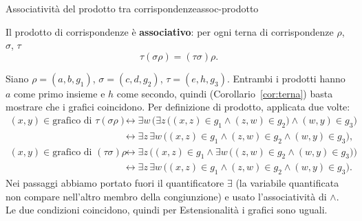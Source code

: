 \begin{concetto}
\begin{Proposizione}{Associatività del prodotto tra corrispondenze}{assoc-prodotto}
    \begin{prerequisiti}
    \end{prerequisiti}
    Il prodotto di corrispondenze è \textbf{associativo}: per ogni terna di corrispondenze $\rho$, $\sigma$, $\tau$
    \[ \tau(\sigma\rho) = (\tau\sigma)\rho. \]
\end{Proposizione}
\begin{dimostrazione}
    Siano $\rho = (a, b, g_1)$, $\sigma = (c, d, g_2)$, $\tau = (e, h, g_3)$. Entrambi i prodotti hanno $a$ come primo
    insieme e $h$ come secondo, quindi (Corollario~\ref{cor:terna}) basta mostrare che i grafici coincidono.
    Per definizione di prodotto, applicata due volte:
    \[
    \begin{aligned}
        (x, y) \in \text{grafico di } \tau(\sigma\rho) &\leftrightarrow \exists w\,\Big(\exists z\,\big((x, z) \in g_1 \wedge (z, w) \in g_2\big) \wedge (w, y) \in g_3\Big)\\
        &\leftrightarrow \exists z\,\exists w\,\big((x, z) \in g_1 \wedge (z, w) \in g_2 \wedge (w, y) \in g_3\big),\\
        (x, y) \in \text{grafico di } (\tau\sigma)\rho &\leftrightarrow \exists z\,\Big((x, z) \in g_1 \wedge \exists w\,\big((z, w) \in g_2 \wedge (w, y) \in g_3\big)\Big)\\
        &\leftrightarrow \exists z\,\exists w\,\big((x, z) \in g_1 \wedge (z, w) \in g_2 \wedge (w, y) \in g_3\big).
    \end{aligned}
    \]
    Nei passaggi abbiamo portato fuori il quantificatore $\exists$ (la variabile quantificata non compare nell'altro
    membro della congiunzione) e usato l'associatività di $\wedge$. Le due condizioni coincidono, quindi per
    Estensionalità i grafici sono uguali.
\end{dimostrazione}
\end{concetto}

